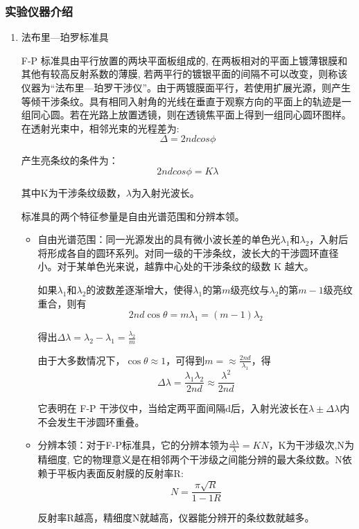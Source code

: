 \documentclass[dvipsnames, svgnames,a4paper,11pt]{article}
\begin{document}
	\subsubsection{实验仪器介绍}
	\begin{enumerate}
		\item 法布里—珀罗标准具
		
		F-P 标准具由平行放置的两块平面板组成的, 在两板相对的平面上镀薄银膜和其他有较高反射系数的薄膜, 若两平行的镀银平面的间隔不可以改变，则称该仪器为“法布里—珀罗干涉仪”。由于两镀膜面平行，若使用扩展光源，则产生等倾干涉条纹。具有相同入射角的光线在垂直于观察方向的平面上的轨迹是一组同心圆。若在光路上放置透镜，则在透镜焦平面上得到一组同心圆环图样。 在透射光束中，相邻光束的光程差为:
		\[
		\Delta = 2 n d cos \phi	
		\]
		
		产生亮条纹的条件为：
		\[
		2 n d cos \phi = K \lambda
		\]
		
		其中K为干涉条纹级数，$\lambda$为入射光波长。
		
		标准具的两个特征参量是自由光谱范围和分辨本领。
		
		\begin{itemize}
			\item 自由光谱范围：同一光源发出的具有微小波长差的单色光$\lambda_1$和$\lambda_2$，入射后将形成各自的圆环系列。对同一级的干涉条纹，波长大的干涉圆环直径小。对于某单色光来说，越靠中心处的干涉条纹的级数 K 越大。
			
			如果$\lambda_1$和$\lambda_2$的波数差逐渐增大，使得$\lambda_1$的第$m$级亮纹与$\lambda_2$的第$m - 1$级亮纹重合，则有
			\[
			2 n d \cos \theta = m \lambda _1 = (m - 1)\lambda_2	
			\]
			
			得出$\Delta \lambda = \lambda _2 - \lambda_1 = \frac{\lambda_2}{m}$
			
			由于大多数情况下，$\cos \theta \approx 1$，可得到$m = \approx \frac{2 n d}{\lambda_1}$，得
			\[
			\Delta \lambda = \frac{\lambda_1 \lambda_2}{2 n d} \approx \frac{\lambda^2}{2 n d}	
			\]
			
			它表明在 F-P 干涉仪中，当给定两平面间隔d后，入射光波长在$\lambda \pm \Delta \lambda$内不会发生干涉圆环重叠。
			
			\item 分辨本领：对于F-P标准具，它的分辨本领为$\frac{\Delta \lambda}{\lambda} = K N$，K为干涉级次,N为精细度, 它的物理意义是在相邻两个干涉级之间能分辨的最大条纹数。N依赖于平板内表面反射膜的反射率R:
			\[
			N = \frac{\pi \sqrt{R}}{1 -1R}	
			\]
			
			反射率R越高，精细度N就越高，仪器能分辨开的条纹数就越多。
			

\end{itemize}
\end{enumerate}
\end{document}
